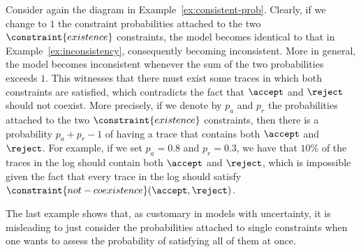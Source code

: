 \begin{example}
  \label{ex:inconsistent-prob}
  Consider again the \pdeclare diagram in Example~\ref{ex:consistent-prob}. Clearly, if we change to $1$ the constraint probabilities attached to the two $\constraint{existence}$ constraints, the model becomes identical to that in Example~\ref{ex:inconsistency}, consequently becoming inconsistent. More in general, the model becomes inconsistent whenever the sum of the two probabilities exceeds $1$. This witnesses that there must exist some traces in which both constraints are satisfied, which contradicts the fact that $\accept$ and $\reject$ should not coexist. More precisely, if we denote by $p_a$ and $p_r$ the probabilities attached to the two $\constraint{existence}$  constraints, then there is a probability $p_a+p_r-1$ of having a trace that contains both $\accept$ and $\reject$.  For example, if we set $p_a = 0.8$ and $p_r = 0.3$, we have that $10\%$ of the traces in the log should contain both $\accept$ and $\reject$, which is impossible given the fact that every trace in the log should satisfy $\constraint{not-coexistence}(\accept,\reject)$.
\end{example}

The last example shows that, as customary in models with uncertainty, it is misleading to just consider the probabilities attached to single constraints when one wants to assess the probability of satisfying all of them at once.

